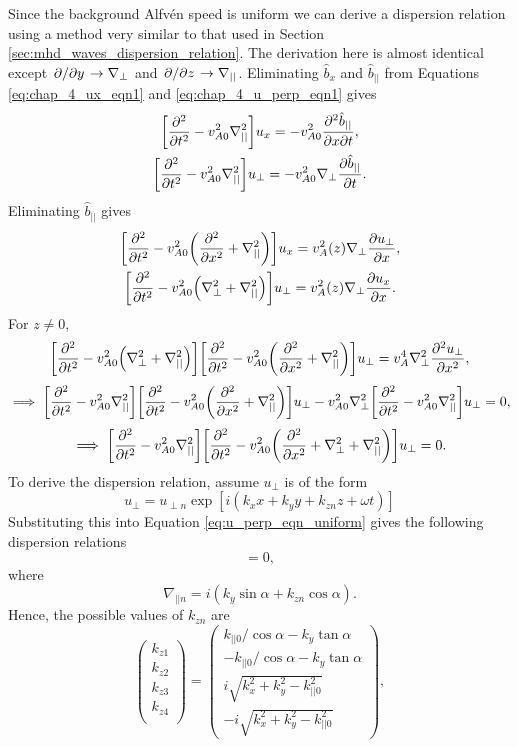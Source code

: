 Since the background Alfv\'en speed is uniform we can derive a dispersion relation using a method very similar to that used in Section \ref{sec:mhd_waves_dispersion_relation}. The derivation here is almost identical except $\pdv*{}{y}\rightarrow\nabla_\perp$ and $\pdv*{}{z}\rightarrow\nabla_{||}$.
Eliminating $\hat{b}_x$ and $\hat{b}_{||}$ from Equations \eqref{eq:chap_4_ux_eqn1} and \eqref{eq:chap_4_u_perp_eqn1} gives
\begin{gather}
    \qty[\pdv[2]{}{t}-v_{A0}^2\nabla_{||}^2]u_x=-v_{A0}^2\pdv{\hat{b}_{||}}{x}{t}, \\
    \qty[\pdv[2]{}{t}-v_{A0}^2\nabla_{||}^2]u_\perp=-v_{A0}^2\nabla_\perp\pdv{\hat{b}_{||}}{t}.
\end{gather}
Eliminating $\hat{b}_{||}$ gives
\begin{gather}
    \label{eq:chap_4_ux_u_perp_eqn_uniform_in_x}
    \qty[\pdv[2]{}{t}-v_{A0}^2\qty(\pdv[2]{}{x}+\nabla_{||}^2)]u_x=v_A^2(z)\nabla_\perp\pdv{u_\perp}{x}, \\
    \qty[\pdv[2]{}{t}-v_{A0}^2\qty(\nabla_\perp^2+\nabla_{||}^2)]u_\perp=v_A^2(z)\nabla_\perp\pdv{u_x}{x}.
\end{gather}
For $z\ne0$,
\[\qty[\pdv[2]{}{t}-v_{A0}^2\qty(\nabla_\perp^2 + \nabla_{||}^2)]\qty[\pdv[2]{}{t}-v_{A0}^2\qty(\pdv[2]{}{x}+\nabla_{||}^2)]u_\perp=v_A^4\nabla_\perp^2 \pdv[2]{u_\perp}{x},\]
\[\implies \qty[\pdv[2]{}{t}-v_{A0}^2\nabla_{||}^2]\qty[\pdv[2]{}{t}-v_{A0}^2\qty(\pdv[2]{}{x}+\nabla_{||}^2)]u_\perp-v_{A0}^2\nabla_\perp^2\qty[\pdv[2]{}{t}-v_{A0}^2\nabla_{||}^2]u_\perp=0,\]
\begin{equation}
    \label{eq:u_perp_eqn_uniform}
    \implies \qty[\pdv[2]{}{t}-v_{A0}^2\nabla_{||}^2]\qty[\pdv[2]{}{t}-v_{A0}^2\qty(\pdv[2]{}{x}+\nabla_\perp^2+\nabla_{||}^2)]u_\perp=0.
\end{equation}
To derive the dispersion relation, assume $u_\perp$ is of the form
\[u_\perp = u_{\perp n}\exp[i(k_x x + k_y y + k_{zn} z + \omega t)]\]
Substituting this into Equation \eqref{eq:u_perp_eqn_uniform} gives the following dispersion relations
\begin{equation}
    [\omega^2+v_{A0}^2\nabla_{||n}^2][\omega^2-v_{A0}^2(k_x^2+k_y^2+k_{zn}^2)]=0,
\end{equation}
where
\begin{equation}
    \nabla_{||n} = i(k_y\sin\alpha+k_{zn}\cos\alpha).
\end{equation}
Hence, the possible values of $k_{zn}$ are
\begin{equation}
\label{eq:chap_4_oblique_field_uniform_dispersion_relation}
\begin{pmatrix}
k_{z1} \\
k_{z2} \\
k_{z3} \\
k_{z4} \\
\end{pmatrix}
=
\begin{pmatrix}
 k_{||0} / \cos\alpha - k_y\tan\alpha \\
-k_{||0} / \cos\alpha - k_y\tan\alpha \\
 i\sqrt{k_x^2+k_y^2 - k_{||0}^2} \\
-i\sqrt{k_x^2+k_y^2 - k_{||0}^2}
\end{pmatrix},
\end{equation}
